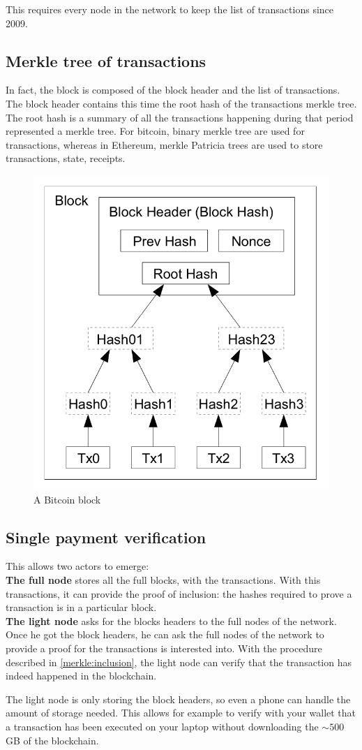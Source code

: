 This requires every node in the network to keep the list of transactions since 2009.

\subsection{Merkle tree of transactions}
In fact, the block is composed of the block header and the list of transactions. The block header contains this time the root hash of the transactions merkle tree.
The root hash is a summary of all the transactions happening during that period represented a merkle tree. For bitcoin, binary merkle tree are used for transactions, whereas in Ethereum, merkle Patricia trees are used to store transactions, state, receipts. 
\begin{figure}[H]
    \centering
\includegraphics[width=0.4\linewidth]{background/blockmerkle.png}
    \caption{A Bitcoin\cite{Nakamoto..09} block}
    \label{fig:blockmerkle}
\end{figure}

\subsection{Single payment verification}
This allows two actors to emerge: \\
\textbf{The full node} stores all the full blocks, with the transactions. With this transactions, it can provide the proof of inclusion: the hashes required to prove a transaction is in a particular block. \\
\textbf{The light node } asks for the blocks headers to the full nodes of the network. Once he got the block headers, he can ask the full nodes of the network to provide a proof for the transactions is interested into. With the procedure described in \ref{merkle:inclusion}, the light node can verify that the transaction has indeed happened in the blockchain.

The light node is only storing the block headers, so even a phone can handle the amount of storage needed. This allows for example to verify with your wallet that a transaction has been executed  on your laptop without downloading the $\sim 500$GB of the blockchain.




